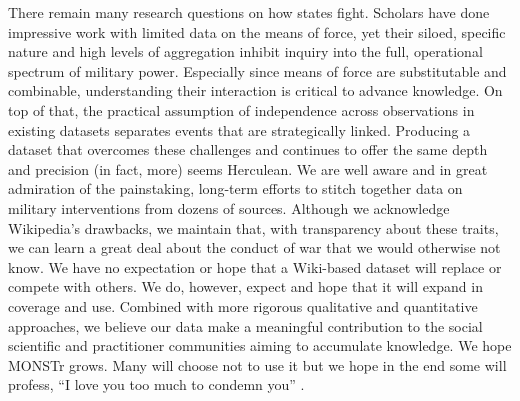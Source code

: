 \documentclass[fleqn,12pt]{article}
\begin{document}
There remain many research questions on how states fight. Scholars have done impressive work with limited data on the means of force, yet their siloed, specific nature and high levels of aggregation inhibit inquiry into the full, operational spectrum of military power. Especially since means of force are substitutable and combinable, understanding their interaction is critical to advance knowledge. On top of that, the practical assumption of independence across observations in existing datasets separates events that are strategically linked. Producing a dataset that overcomes these challenges and continues to offer the same depth and precision (in fact, more) seems Herculean. We are well aware and in great admiration of the painstaking, long-term efforts to stitch together data on military interventions from dozens of sources. Although we acknowledge Wikipedia's drawbacks, we maintain that, with transparency about these traits, we can learn a great deal about the conduct of war that we would otherwise not know. We have no expectation or hope that a Wiki-based dataset will replace or compete with others. We do, however, expect and hope that it will expand in coverage and use. Combined with more rigorous qualitative and quantitative approaches, we believe our data make a meaningful contribution to the social scientific and practitioner communities aiming to accumulate knowledge. We hope MONSTr grows. Many will choose not to use it but we hope in the end some will profess, ``I love you too much to condemn you” \citep{coppola_dracula_1992}.

\newpage

\thispagestyle{empty}
    \begin{landscape}
        
    \end{landscape}
\pagestyle{plain}

\clearpage
\begin{landscape}
\thispagestyle{empty}
    
\end{landscape}

\clearpage
\thispagestyle{empty}
    
\pagestyle{plain}
\end{document}
